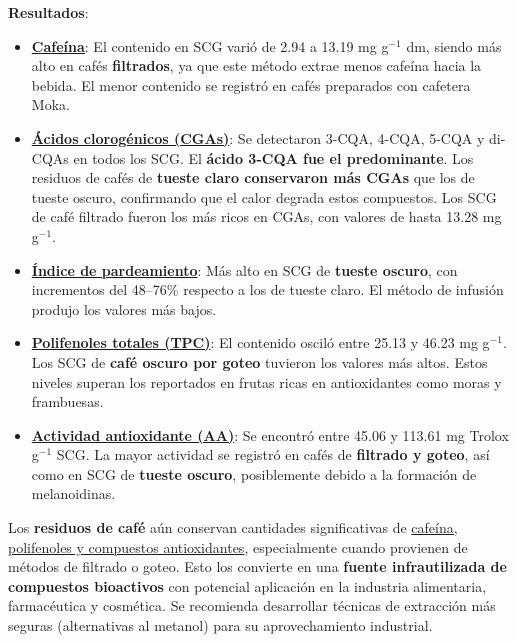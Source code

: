 \documentclass{article}
\begin{document}
\textbf{Resultados}:  
\begin{itemize}
	\item \underline{\textbf{Cafeína}}:  
	El contenido en SCG varió de 2.94 a 13.19 mg g$^{-1}$ dm, siendo más alto en cafés \textbf{filtrados}, ya que este método extrae menos cafeína hacia la bebida. El menor contenido se registró en cafés preparados con cafetera Moka.  
	
	\item \underline{\textbf{Ácidos clorogénicos (CGAs)}}:  
	Se detectaron 3-CQA, 4-CQA, 5-CQA y di-CQAs en todos los SCG. El \textbf{ácido 3-CQA fue el predominante}. Los residuos de cafés de \textbf{tueste claro conservaron más CGAs} que los de tueste oscuro, confirmando que el calor degrada estos compuestos. Los SCG de café filtrado fueron los más ricos en CGAs, con valores de hasta 13.28 mg g$^{-1}$.  
	
	\item \underline{\textbf{Índice de pardeamiento}}:  
	Más alto en SCG de \textbf{tueste oscuro}, con incrementos del 48–76\% respecto a los de tueste claro. El método de infusión produjo los valores más bajos.  
	
	\item \underline{\textbf{Polifenoles totales (TPC)}}:  
	El contenido osciló entre 25.13 y 46.23 mg g$^{-1}$. Los SCG de \textbf{café oscuro por goteo} tuvieron los valores más altos. Estos niveles superan los reportados en frutas ricas en antioxidantes como moras y frambuesas.  
	
	\item \underline{\textbf{Actividad antioxidante (AA)}}:  
	Se encontró entre 45.06 y 113.61 mg Trolox g$^{-1}$ SCG. La mayor actividad se registró en cafés de \textbf{filtrado y goteo}, así como en SCG de \textbf{tueste oscuro}, posiblemente debido a la formación de melanoidinas.  
\end{itemize} \vspace{0.5cm}

Los \textbf{residuos de café} aún conservan cantidades significativas de \underline{cafeína, polifenoles y compuestos antioxidantes}, especialmente cuando provienen de métodos de filtrado o goteo. Esto los convierte en una \textbf{fuente infrautilizada de compuestos bioactivos} con potencial aplicación en la industria alimentaria, farmacéutica y cosmética. Se recomienda desarrollar técnicas de extracción más seguras (alternativas al metanol) para su aprovechamiento industrial. \vspace{0.5cm}
\end{document}
